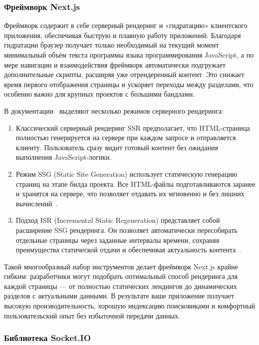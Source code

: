 \subsubsection*{Фреймворк Next.js}

Фреймворк содержит в себе серверный рендеринг и «гидратацию» клиентского приложения, обеспечивая быструю и плавную работу приложений. Благодаря гидратации браузер получает только необходимый на текущий момент минимальный объём текста программы языка программирования JavaScript, а по мере навигации и взаимодействия фреймворк автоматически подгружает дополнительные скрипты, расширяя уже отрендеренный контент. Это снижает время первого отображения страницы и ускоряет переходы между разделами, что особенно важно для крупных проектов с большими бандлами.

В документации~\cite{nextjs_ssr} выделяют несколько режимов серверного рендеринга:
\begin{enumerate}
  \item Классический серверный рендеринг SSR предполагает, что HTML-страница полностью генерируется на сервере при каждом запросе и отправляется клиенту. Пользователь сразу видит готовый контент без ожидания выполнения JavaScript-логики.
  \item Режим SSG (Static Site Generation) использует статическую генерацию страниц на этапе билда проекта. Все HTML-файлы подготавливаются заранее и хранятся на сервере, что позволяет отдавать их мгновенно и без лишних вычислений~\cite{nextjs_ssg_isr}.
  \item Подход ISR (Incremental Static Regeneration) представляет собой расширение SSG рендеринга. Он позволяет автоматически пересобирать отдельные страницы через заданные интервалы времени, сохраняя преимущества статической отдачи и обеспечивая актуальность контента~\cite{nextjs_ssg_isr}.
\end{enumerate}


Такой многообразный набор инструментов делает фреймворк Next.js крайне гибким: разработчики могут подобрать оптимальный способ рендеринга для каждой страницы --- от полностью статических лендингов до динамических разделов с актуальными данными. В результате ваше приложение получает высокую производительность, хорошую индексацию поисковиками и комфортный пользовательский опыт без избыточной передачи данных.

\subsubsection*{Библиотека Socket.IO}

